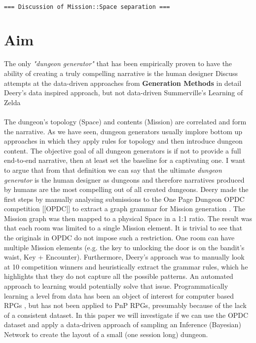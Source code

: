 \documentclass{UoYCSproject}
\begin{document}
\paragraph{}
\texttt{=== Discussion of Mission::Space separation ===}

\section{Aim}
\begin{outline}
  \1 The only \textit{"dungeon generator"} that has been empirically proven to have the ability of creating a truly compelling narrative is the human designer
  \1 Discuss attempts at the data-driven approaches from \textbf{Generation Methods} in detail
    \2 Deery's data inspired approach, but not data-driven
    \2 Summerville's Learning of Zelda
\end{outline}

\paragraph{}
The dungeon’s topology (Space) and contents (Mission) are correlated and form the narrative. As we have seen, dungeon generators usually implore bottom up approaches in which they apply rules for topology and then introduce dungeon content. The objective goal of all dungeon generators is if not to provide a full end-to-end narrative, then at least set the baseline for a captivating one. I want to argue that from that definition we can say that the ultimate \textit{dungeon generator} is the human designer as dungeons and therefore narratives produced by humans are the most compelling out of all created dungeons. Deery made the first steps by manually analysing submissions to the One Page Dungeon OPDC competition [[OPDC]] to extract a graph grammar for Mission generation \parencite{Deery}. The Mission graph was then mapped to a physical Space in a 1:1 ratio. The result was that each room was limited to a single Mission element. It is trivial to see that the originals in OPDC do not impose such a restriction. One room can have multiple Mission elements (e.g. the key to unlocking the door is on the bandit’s waist, Key + Encounter). Furthermore, Deery’s approach was to manually look at 10 competition winners and heuristically extract the grammar rules, which he highlights that they do not capture all the possible patterns. An automated approach to learning would potentially solve that issue. Programmatically learning a level from data has been an object of interest for computer based RPGs \parencite{SummervilleLearningOfZelda}, but has not been applied to PnP RPGs, presumably because of the lack of a consistent dataset. In this paper we will investigate if we can use the OPDC dataset and apply a data-driven approach of sampling an Inference (Bayesian) Network to create the layout of a small (one session long) dungeon.
\end{document}
